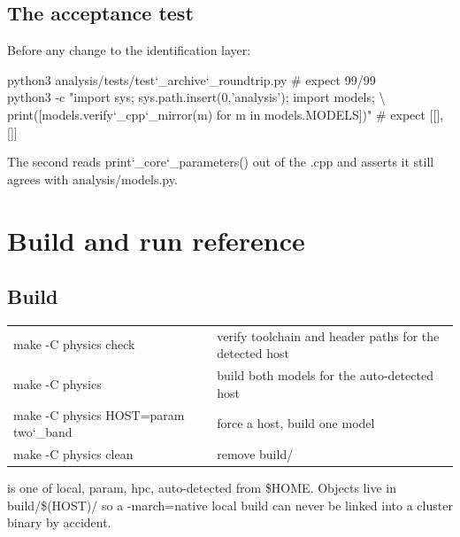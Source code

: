 \documentclass[11pt,a4paper]{article}
\newcommand{\code}[1]{{\ttfamily #1}}
\newcommand{\brk}{\discretionary{}{}{}}
\newcommand{\uu}{\char`_\brk}
\newcommand{\fn}[1]{{\ttfamily #1}}
\begin{document}
\subsection{The acceptance test}

Before any change to the identification layer:

\begin{center}\ttfamily\scriptsize
python3 analysis/tests/test\uu archive\uu roundtrip.py \hfill \# expect 99/99\\[2pt]
python3 -c "import sys; sys.path.insert(0,'analysis'); import models; \textbackslash\\
\hspace*{2em}print([models.verify\uu cpp\uu mirror(m) for m in models.MODELS])" \hfill \# expect [[], []]
\end{center}

\noindent The second reads \fn{print\uu core\uu parameters()} out of the
\code{.cpp} and asserts it still agrees with \code{analysis/models.py}.

\section{Build and run reference}

\subsection{Build}

\begin{center}\ttfamily\scriptsize
\begin{tabular}{@{}l l@{}}
make -C physics check                & verify toolchain and header paths for the detected host \\
make -C physics                      & build both models for the auto-detected host \\
make -C physics HOST=param two\uu band & force a host, build one model \\
make -C physics clean                & remove \code{build/} \\
\end{tabular}
\end{center}

\noindent \fn{HOST} is one of \fn{local}, \fn{param}, \fn{hpc}, auto-detected
from \fn{\$HOME}. Objects live in \code{build/\$(HOST)/} so a
\fn{-march=native} local build can never be linked into a cluster binary by
accident.
\end{document}
